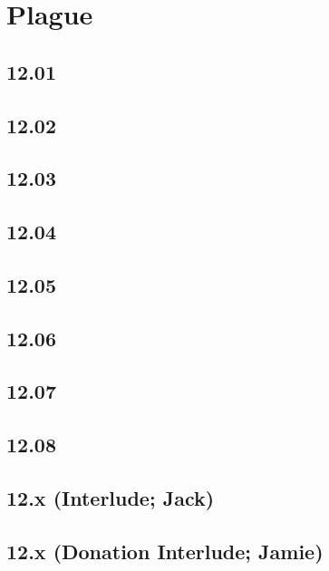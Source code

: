 \part{Plague}
 \chapter{12.01}
 \chapter{12.02}
 \chapter{12.03}
 \chapter{12.04}
 \chapter{12.05}
 \chapter{12.06}
 \chapter{12.07}
 \chapter{12.08}
 \chapter{12.x (Interlude; Jack)}
 \chapter{12.x (Donation Interlude; Jamie)}











